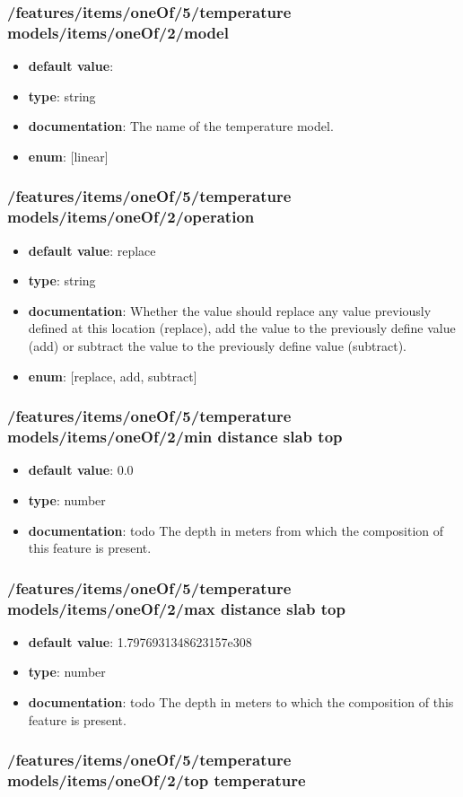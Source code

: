\subsubsection{/features/items/oneOf/5/temperature models/items/oneOf/2/model}
\begin{itemize}\item {\bf default value}: 
\item {\bf type}: string
\item {\bf documentation}: The name of the temperature model.
\item {\bf enum}: [linear]\end{itemize}\subsubsection{/features/items/oneOf/5/temperature models/items/oneOf/2/operation}
\begin{itemize}\item {\bf default value}: replace
\item {\bf type}: string
\item {\bf documentation}: Whether the value should replace any value previously defined at this location (replace), add the value to the previously define value (add) or subtract the value to the previously define value (subtract).
\item {\bf enum}: [replace, add, subtract]\end{itemize}\subsubsection{/features/items/oneOf/5/temperature models/items/oneOf/2/min distance slab top}
\begin{itemize}\item {\bf default value}: 0.0
\item {\bf type}: number
\item {\bf documentation}: todo The depth in meters from which the composition of this feature is present.
\end{itemize}\subsubsection{/features/items/oneOf/5/temperature models/items/oneOf/2/max distance slab top}
\begin{itemize}\item {\bf default value}: 1.7976931348623157e308
\item {\bf type}: number
\item {\bf documentation}: todo The depth in meters to which the composition of this feature is present.
\end{itemize}\subsubsection{/features/items/oneOf/5/temperature models/items/oneOf/2/top temperature}
